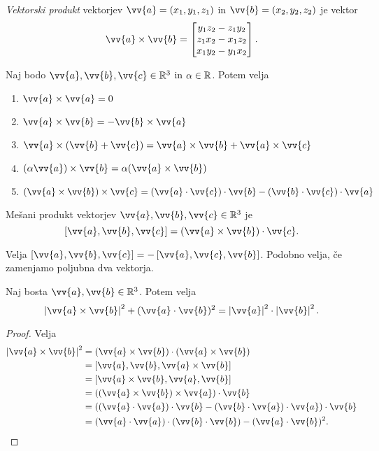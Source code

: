 \documentclass[12pt, a4paper]{article}
\begin{document}
\begin{okvir}
\begin{definicija}
\emph{Vektorski produkt} vektorjev $\vv{a}=(x_1,y_1,z_1)$ in $\vv{b}=(x_2,y_2,z_2)$ je vektor
\[
\vv{a}\times\vv{b}=
\begin{bmatrix}
y_1z_2-z_1y_2 \\
z_1x_2-x_1z_2 \\
x_1y_2-y_1x_2
\end{bmatrix}.
\]
\end{definicija}
\end{okvir}

\begin{posledica}
Naj bodo $\vv{a},\vv{b},\vv{c}\in\R^3$ in $\alpha\in\mathbb{R}$. Potem velja

\begin{enumerate}[label=\arabic*)]
\item $\vv{a}\times\vv{a}=0$
\item $\vv{a}\times\vv{b}=-\vv{b}\times\vv{a}$
\item $\vv{a}\times(\vv{b}+\vv{c})=\vv{a}\times\vv{b}+\vv{a}\times\vv{c}$
\item $(\alpha\vv{a})\times\vv{b}=\alpha(\vv{a}\times\vv{b})$
\item $(\vv{a}\times\vv{b})\times\vv{c}=(\vv{a}\cdot\vv{c})\cdot\vv{b}-(\vv{b}\cdot\vv{c})\cdot\vv{a}$
\end{enumerate}
\end{posledica}

\begin{definicija}
Mešani produkt vektorjev $\vv{a},\vv{b},\vv{c}\in\R^3$ je
\[
\left[\vv{a},\vv{b},\vv{c}\right]=(\vv{a}\times\vv{b})\cdot\vv{c}.
\]
\end{definicija}

\begin{trditev}
Velja $\left[\vv{a},\vv{b},\vv{c}\right]=-\left[\vv{a},\vv{c},\vv{b}\right]$. Podobno velja, če zamenjamo poljubna dva vektorja.
\end{trditev}

\begin{trditev}
Naj bosta $\vv{a},\vv{b}\in\R^3$. Potem velja
\[
\left|\vv{a}\times\vv{b}\right|^2+(\vv{a}\cdot\vv{b})^2=\left|\vv{a}\right|^2\cdot\left|\vv{b}\right|^2.
\]
\end{trditev}

\begin{proof}
Velja
\begin{align*}
\left|\vv{a}\times\vv{b}\right|^2&=(\vv{a}\times\vv{b})\cdot(\vv{a}\times\vv{b})
\\
&=\left[\vv{a},\vv{b},\vv{a}\times\vv{b}\right]
\\
&=\left[\vv{a}\times\vv{b},\vv{a},\vv{b}\right]
\\
&=((\vv{a}\times\vv{b})\times\vv{a})\cdot\vv{b}
\\
&=((\vv{a}\cdot\vv{a})\cdot\vv{b}-(\vv{b}\cdot\vv{a})\cdot\vv{a})\cdot\vv{b}
\\
&=(\vv{a}\cdot\vv{a})\cdot(\vv{b}\cdot\vv{b})-(\vv{a}\cdot\vv{b})^2.\qedhere
\end{align*}
\end{proof}
\end{document}
